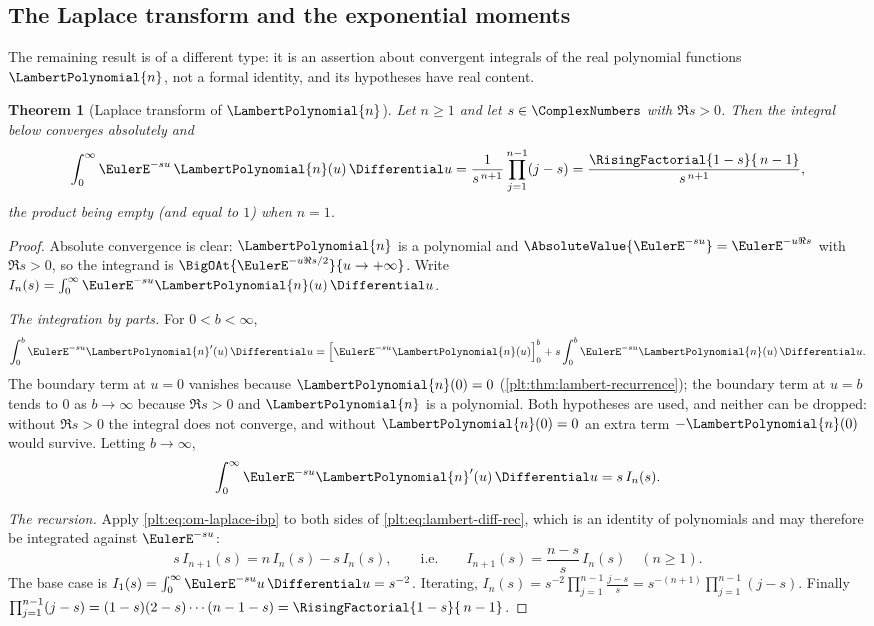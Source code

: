 \documentclass[11pt,oneside]{article}
\theoremstyle{plain}
\newtheorem{theorem}{Theorem}[section]
\theoremstyle{definition}
\theoremstyle{remark}
\newcommand{\LamP}[1]{\LambertPolynomial{#1}}
\begin{document}
\subsection{The Laplace transform and the exponential moments}

The remaining result is of a different type: it is an assertion about
convergent integrals of the real polynomial functions \(\LamP{n}\), not a
formal identity, and its hypotheses have real content.

\begin{theorem}[Laplace transform of \(\LamP{n}\)]
\label{plt:thm:om-laplace}
Let \(n\ge1\) and let \(s\in\ComplexNumbers\) with \(\Re s>0\).  Then the
integral below converges absolutely and
\begin{equation}\label{plt:eq:om-laplace}
 \int_{0}^{\infty}\EulerE^{-su}\,\LamP{n}(u)\,\Differential u
 =\frac{1}{s^{\,n+1}}\prod_{j=1}^{n-1}(j-s)
 =\frac{\RisingFactorial{1-s}{\,n-1}}{s^{\,n+1}},
\end{equation}
the product being empty (and equal to \(1\)) when \(n=1\).
\end{theorem}

\begin{proof}
Absolute convergence is clear: \(\LamP{n}\) is a polynomial and
\(\AbsoluteValue{\EulerE^{-su}}=\EulerE^{-u\Re s}\) with \(\Re s>0\), so the
integrand is \(\BigOAt{\EulerE^{-u\Re s/2}}{u\to+\infty}\).  Write
\(I_n(s)=\int_0^\infty\EulerE^{-su}\LamP{n}(u)\,\Differential u\).

\emph{The integration by parts.}  For \(0<b<\infty\),
\[
 \int_{0}^{b}\EulerE^{-su}{\LamP{n}}'(u)\,\Differential u
 =\Bigl[\EulerE^{-su}\LamP{n}(u)\Bigr]_{0}^{b}
  +s\int_{0}^{b}\EulerE^{-su}\LamP{n}(u)\,\Differential u .
\]
The boundary term at \(u=0\) vanishes because \(\LamP{n}(0)=0\)
(\cref{plt:thm:lambert-recurrence}); the boundary term at \(u=b\) tends to
\(0\) as \(b\to\infty\) because \(\Re s>0\) and \(\LamP{n}\) is a
polynomial.  Both hypotheses are used, and neither can be dropped: without
\(\Re s>0\) the integral does not converge, and without
\(\LamP{n}(0)=0\) an extra term \(-\LamP{n}(0)\) would survive.  Letting
\(b\to\infty\),
\begin{equation}\label{plt:eq:om-laplace-ibp}
 \int_{0}^{\infty}\EulerE^{-su}{\LamP{n}}'(u)\,\Differential u=s\,I_n(s).
\end{equation}

\emph{The recursion.}  Apply \eqref{plt:eq:om-laplace-ibp} to both sides of
\eqref{plt:eq:lambert-diff-rec}, which is an identity of polynomials and may
therefore be integrated against \(\EulerE^{-su}\):
\[
 s\,I_{n+1}(s)=n\,I_n(s)-s\,I_n(s),
 \qquad\text{i.e.}\qquad
 I_{n+1}(s)=\frac{n-s}{s}\,I_n(s)\quad(n\ge1).
\]
The base case is \(I_1(s)=\int_0^\infty\EulerE^{-su}u\,\Differential u=s^{-2}\).
Iterating,
\(I_n(s)=s^{-2}\prod_{j=1}^{n-1}\frac{j-s}{s}=s^{-(n+1)}\prod_{j=1}^{n-1}(j-s)\).
Finally \(\prod_{j=1}^{n-1}(j-s)=(1-s)(2-s)\cdots(n-1-s)
=\RisingFactorial{1-s}{\,n-1}\).
\end{proof}
\end{document}

